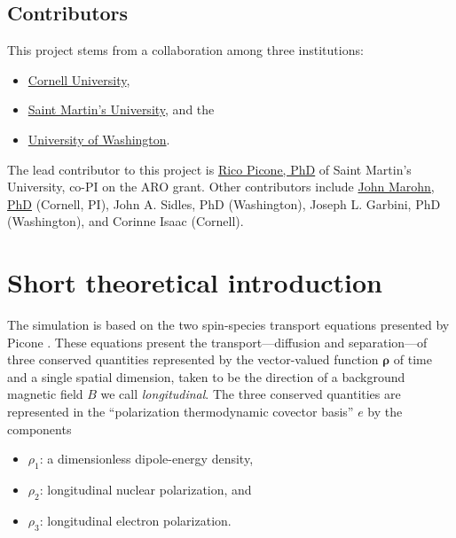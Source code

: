 \documentclass[%
oneside,                 %
final,                   %
10pt]{article}
\begin{document}
\subsection{Contributors}

This project stems from a collaboration among three institutions:

\begin{itemize}
\item \href{{http://www.cornell.edu/}}{Cornell University},

\item \href{{https://www.stmartin.edu/}}{Saint Martin's University}, and the

\item \href{{http://www.washington.edu/}}{University of Washington}.
\end{itemize}

\noindent
The lead contributor to this project is \href{{http://ricopic.one}}{Rico Picone, PhD} of Saint Martin's University, co-PI on the ARO grant.
Other contributors include \href{{http://marohn.chem.cornell.edu/}}{John Marohn, PhD} (Cornell, PI), John A. Sidles, PhD (Washington), Joseph L. Garbini, PhD (Washington), and Corinne Isaac (Cornell).

\section{Short theoretical introduction}
\label{section:shorttheory}

The simulation is based on the two spin-species transport equations presented by Picone \cite{Picone2014b}.
These equations present the transport---diffusion and separation---of three conserved quantities represented by the vector-valued function $\bm{\rho}$ of time and a single spatial dimension, taken to be the direction of a background magnetic field $B$ we call \emph{longitudinal}.
The three conserved quantities are represented in the ``polarization thermodynamic covector basis'' $e$ by the components \cite{Picone2014b}

\begin{itemize}
\item $\rho_1$: a dimensionless dipole-energy density,

\item $\rho_2$: longitudinal nuclear polarization, and

\item $\rho_3$: longitudinal electron polarization.
\end{itemize}
\end{document}
